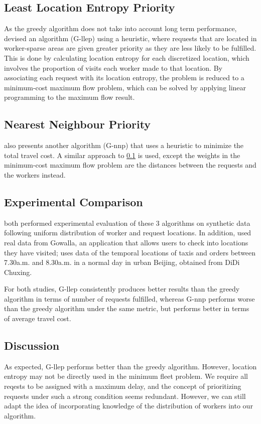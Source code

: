 \documentclass[urop]{socreport}
\begin{document}
\subsection{Least Location Entropy Priority}
\label{llep}
As the greedy algorithm does not take into account long term performance, \cite{kazemi} devised an algorithm (G-llep) using a heuristic, where requests that are located in worker-sparse areas are given greater priority as they are less likely to be fulfilled. This is done by calculating location entropy for each discretized location, which involves the proportion of visits each worker made to that location. By associating each request with its location entropy, the problem is reduced to a minimum-cost maximum flow problem, which can be solved by applying linear programming to the maximum flow result.

\subsection{Nearest Neighbour Priority}
\cite{kazemi} also presents another algorithm (G-nnp) that uses a heuristic to minimize the total travel cost. A similar approach to \ref{llep} is used, except the weights in the minimum-cost maximum flow problem are the distances between the requests and the workers instead.
\label{nnp}

\subsection{Experimental Comparison}
\cite{kazemi,cheng} both performed experimental evaluation of these 3 algorithms on synthetic data following uniform distribution of worker and request locations. In addition, \cite{kazemi} used real data from Gowalla, an application that allows users to check into locations they have visited; \cite{cheng} uses data of the temporal locations of taxis and orders between 7.30a.m. and 8.30a.m. in a normal day in urban Beijing, obtained from DiDi Chuxing.

For both studies, G-llep consistently produces better results than the greedy algorithm in terms of number of requests fulfilled, whereas G-nnp performs worse than the greedy algorithm under the same metric, but performs better in terms of average travel cost.  
\label{nnpexp}

\subsection{Discussion}
\label{discussion}
As expected, G-llep performs better than the greedy algorithm. However, location entropy may not be directly used in the minimum fleet problem. We require all reqests to be assigned with a maximum delay, and the concept of prioritizing requests under such a strong condition seems redundant. However, we can still adapt the idea of incorporating knowledge of the distribution of workers into our algorithm.
\end{document}

